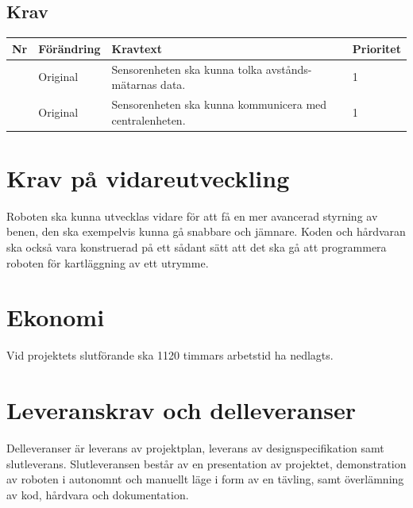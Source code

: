 \documentclass[a4paper,titlepage,12pt]{article}
\newcounter{reqNr}
\newcommand{\nextReqNr}{\stepcounter{reqNr}\arabic{reqNr}}
\begin{document}
	\subsection{Krav}
	\begin{table}[h]
		\label{tab:Krav sensorenhet}
		\begin{tabularx}{\textwidth}{|c|l|X|l|}
			\hline
			\textbf{Nr} & \textbf{Förändring} & \textbf{Kravtext} & \textbf{Prioritet} 
				\\ \hline

			\nextReqNr & Original & Sensorenheten ska kunna tolka avstånds- mätarnas data. & 1
				\\ \hline

			\nextReqNr & Original & Sensorenheten ska kunna kommunicera med 
				centralenheten. & 1
				\\ \hline

		\end{tabularx}
	\end{table}


	\section{Krav på vidareutveckling}
	Roboten ska kunna utvecklas vidare för att få en mer avancerad styrning av benen, 
	den ska exempelvis kunna gå snabbare och jämnare. Koden och hårdvaran ska också vara
	konstruerad på ett sådant sätt att det ska gå att programmera roboten för
	kartläggning av ett utrymme.

	\section{Ekonomi}
	Vid projektets slutförande ska 1120 timmars arbetstid ha nedlagts.

	\section{Leveranskrav och delleveranser}
	Delleveranser är leverans av projektplan, leverans av designspecifikation 
	samt slutleverans. Slutleveransen består av en presentation av projektet, 
	demonstration av roboten i autonomnt och manuellt läge i form av en tävling,
	samt överlämning av kod, hårdvara och dokumentation.
\end{document}
